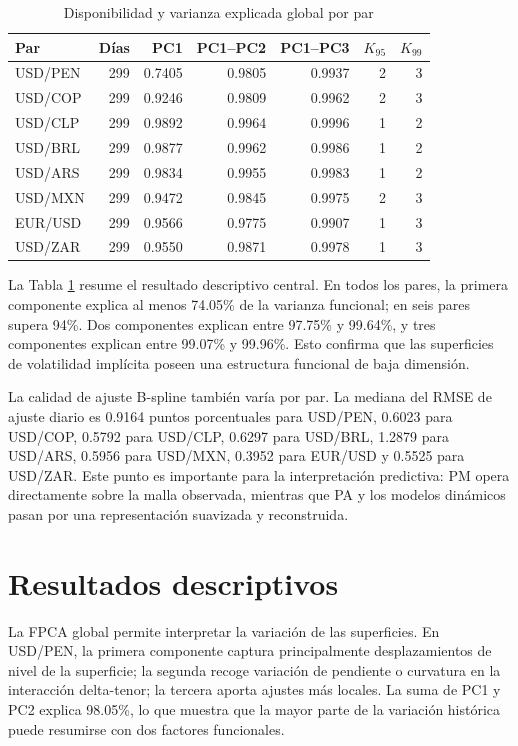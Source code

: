 \documentclass[a4paper,11pt]{article}
\newcommand{\SVIs}{superficies de volatilidad implícita}
\begin{document}
\begin{table}[H]
\centering
\caption{Disponibilidad y varianza explicada global por par}
\label{tab:fpca_global}
\small
\begin{tabular}{lrrrrrr}
\toprule
Par & Días & PC1 & PC1--PC2 & PC1--PC3 & \(K_{95}\) & \(K_{99}\) \\
\midrule
USD/PEN & 299 & 0.7405 & 0.9805 & 0.9937 & 2 & 3 \\
USD/COP & 299 & 0.9246 & 0.9809 & 0.9962 & 2 & 3 \\
USD/CLP & 299 & 0.9892 & 0.9964 & 0.9996 & 1 & 2 \\
USD/BRL & 299 & 0.9877 & 0.9962 & 0.9986 & 1 & 2 \\
USD/ARS & 299 & 0.9834 & 0.9955 & 0.9983 & 1 & 2 \\
USD/MXN & 299 & 0.9472 & 0.9845 & 0.9975 & 2 & 3 \\
EUR/USD & 299 & 0.9566 & 0.9775 & 0.9907 & 1 & 3 \\
USD/ZAR & 299 & 0.9550 & 0.9871 & 0.9978 & 1 & 3 \\
\bottomrule
\end{tabular}
\end{table}

La Tabla \ref{tab:fpca_global} resume el resultado descriptivo central. En todos los pares, la primera componente explica al menos 74.05\% de la varianza funcional; en seis pares supera 94\%. Dos componentes explican entre 97.75\% y 99.64\%, y tres componentes explican entre 99.07\% y 99.96\%. Esto confirma que las \SVIs{} poseen una estructura funcional de baja dimensión.

La calidad de ajuste B-spline también varía por par. La mediana del RMSE de ajuste diario es 0.9164 puntos porcentuales para USD/PEN, 0.6023 para USD/COP, 0.5792 para USD/CLP, 0.6297 para USD/BRL, 1.2879 para USD/ARS, 0.5956 para USD/MXN, 0.3952 para EUR/USD y 0.5525 para USD/ZAR. Este punto es importante para la interpretación predictiva: PM opera directamente sobre la malla observada, mientras que PA y los modelos dinámicos pasan por una representación suavizada y reconstruida.

\section{Resultados descriptivos}

La FPCA global permite interpretar la variación de las superficies. En USD/PEN, la primera componente captura principalmente desplazamientos de nivel de la superficie; la segunda recoge variación de pendiente o curvatura en la interacción delta-tenor; la tercera aporta ajustes más locales. La suma de PC1 y PC2 explica 98.05\%, lo que muestra que la mayor parte de la variación histórica puede resumirse con dos factores funcionales.
\end{document}
